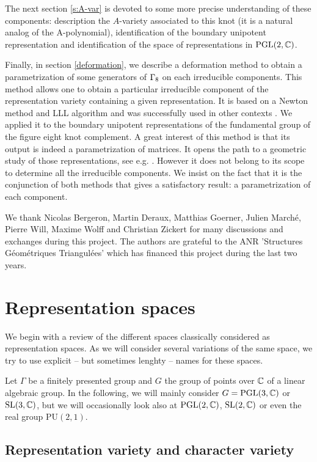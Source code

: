 The next section \ref{s:A-var} is devoted to some more precise understanding of these components: description the $A$-variety associated to this knot (it is a natural analog of the A-polynomial), identification of the boundary unipotent representation and identification of the space of representations in $\textrm{PGL}(2,\mathbb{C})$.

Finally, in section \ref{deformation}, we describe a deformation method to obtain a parametrization of some generators of $\Gamma_{8}$ on each irreducible components.
This method allows one to obtain a particular irreducible component
of the representation variety containing a given representation.  It is based on a Newton method and LLL algorithm and was successfully used in other contexts
\cite{CLTa,CLTb}. We applied it to the boundary unipotent representations
of the fundamental group of the figure eight knot complement. A great interest of this method is that its output is indeed a parametrization of matrices. It opens the path to a geometric study of those representations, see e.g. \cite{DF}.
However it does not belong to its scope to determine all the irreducible components. We insist on the fact that it is the conjunction of both methods that gives a satisfactory result: a parametrization of each component.

We thank Nicolas Bergeron, Martin Deraux,  Matthias Goerner, Julien March\'e, Pierre Will, Maxime Wolff and Christian Zickert for many discussions and exchanges during this project.
The authors are grateful to the ANR 'Structures G\'eom\'etriques Triangul\'ees' which has financed this project during  the last two years.

\section{Representation spaces}

We begin with a review of the different spaces classically considered as representation spaces. As we will consider several variations of the same space, we try to use explicit -- but sometimes lenghty -- names for these spaces.

Let $\Gamma$ be a finitely presented group and $G$ the group of points over $\mathbb{C}$ of a linear algebraic group. In the following, we will mainly consider $G=\textrm{PGL}(3,\mathbb{C})$ or $\textrm{SL}(3,\mathbb{C})$, but we will occasionally look also at $\textrm{PGL}(2,\mathbb{C})$, $\textrm{SL}(2,\mathbb{C})$ or even the real group $\mathrm{PU}(2,1)$. 

\subsection{Representation variety and character variety}


